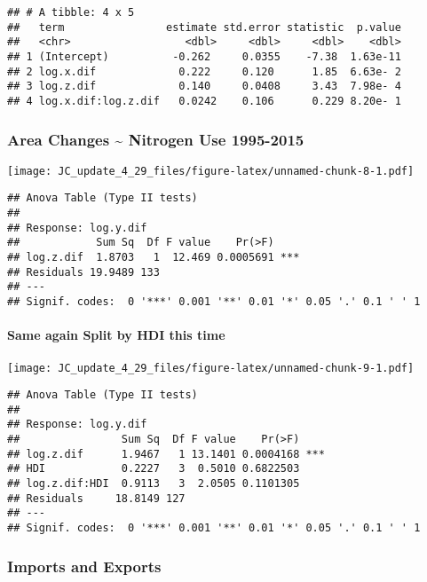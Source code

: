 \documentclass[
]{article}
\begin{document}
\begin{verbatim}
## # A tibble: 4 x 5
##   term                estimate std.error statistic  p.value
##   <chr>                  <dbl>     <dbl>     <dbl>    <dbl>
## 1 (Intercept)          -0.262     0.0355    -7.38  1.63e-11
## 2 log.x.dif             0.222     0.120      1.85  6.63e- 2
## 3 log.z.dif             0.140     0.0408     3.43  7.98e- 4
## 4 log.x.dif:log.z.dif   0.0242    0.106      0.229 8.20e- 1
\end{verbatim}

\hypertarget{area-changes-nitrogen-use-1995-2015}{%
\subsubsection{Area Changes \textasciitilde{} Nitrogen Use
1995-2015}\label{area-changes-nitrogen-use-1995-2015}}

\texttt{[image: JC\_update\_4\_29\_files/figure-latex/unnamed-chunk-8-1.pdf]}

\begin{verbatim}
## Anova Table (Type II tests)
## 
## Response: log.y.dif
##            Sum Sq  Df F value    Pr(>F)    
## log.z.dif  1.8703   1  12.469 0.0005691 ***
## Residuals 19.9489 133                      
## ---
## Signif. codes:  0 '***' 0.001 '**' 0.01 '*' 0.05 '.' 0.1 ' ' 1
\end{verbatim}

\hypertarget{same-again-split-by-hdi-this-time}{%
\paragraph{Same again Split by HDI this
time}\label{same-again-split-by-hdi-this-time}}

\texttt{[image: JC\_update\_4\_29\_files/figure-latex/unnamed-chunk-9-1.pdf]}

\begin{verbatim}
## Anova Table (Type II tests)
## 
## Response: log.y.dif
##                Sum Sq  Df F value    Pr(>F)    
## log.z.dif      1.9467   1 13.1401 0.0004168 ***
## HDI            0.2227   3  0.5010 0.6822503    
## log.z.dif:HDI  0.9113   3  2.0505 0.1101305    
## Residuals     18.8149 127                      
## ---
## Signif. codes:  0 '***' 0.001 '**' 0.01 '*' 0.05 '.' 0.1 ' ' 1
\end{verbatim}

\hypertarget{imports-and-exports}{%
\subsubsection{Imports and Exports}\label{imports-and-exports}}
\end{document}

